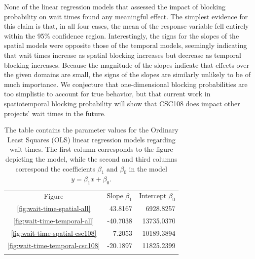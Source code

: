 None of the linear regression models that assessed the impact of blocking
probability on wait times found any meaningful effect. The simplest evidence
for this claim is that, in all four cases, the mean of the response variable
fell entirely within the 95\% confidence region. Interestingly, the signs for
the slopes of the spatial models were opposite those of the temporal models,
seemingly indicating that wait times increase as spatial blocking increases but
decrease as temporal blocking increases. Because the magnitude of the slopes
indicate that effects over the given domains are small, the signs of the slopes
are similarly unlikely to be of much importance. We conjecture that
one-dimensional blocking probabilities are too simplistic to account for true
behavior, but that current work in spatiotemporal blocking probability will
show that CSC108 does impact other projects' wait times in the future.


\begin{table}
\caption{The table contains the parameter values for the Ordinary Least Squares
(OLS) linear regression models regarding wait times. The first column
corresponds to the figure depicting the model, while the second and third
columns correspond the coefficients $\beta_1$ and $\beta_0$ in the model
$y = \beta_{1}x + \beta_0$.}
\label{tab:wait-time-params}       %
\begin{tabular}{crr}
\hline\noalign{\smallskip}
Figure  & Slope $\beta_1$ & Intercept $\beta_0$  \\
\noalign{\smallskip}\hline\noalign{\smallskip}
\ref{fig:wait-time-spatial-all}     &    43.8167    &    6928.8257  \\
\ref{fig:wait-time-temporal-all}    &   -40.7038    &   13735.0370  \\
\ref{fig:wait-time-spatial-csc108}  &     7.2053    &   10189.3894  \\
\ref{fig:wait-time-temporal-csc108} &   -20.1897    &   11825.2399  \\
\noalign{\smallskip}\hline
\end{tabular}
\end{table}


